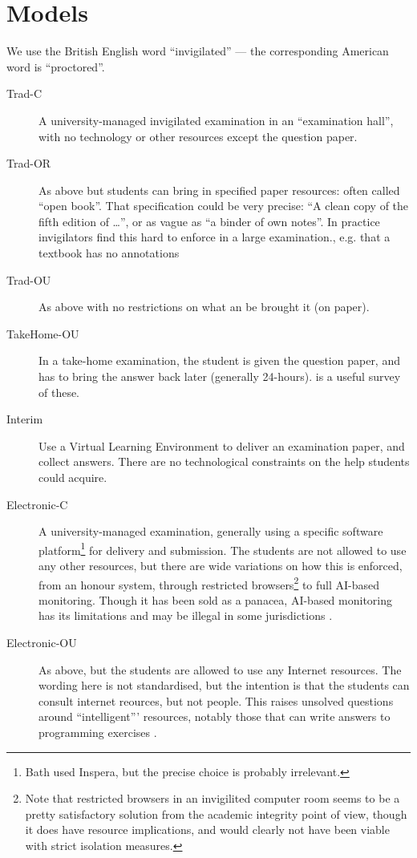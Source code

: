 \documentclass{article}
\begin{document}
\section{Models}
We use the British English word ``invigilated'' --- the corresponding American word is ``proctored''.
\begin{description}
\item[Trad-C]A university-managed invigilated examination in an ``examination hall'', with no technology or other resources except the question paper.
\item[Trad-OR]As above but students can bring in specified paper resources: often called ``open book''. That specification could be very precise: ``A clean copy of the fifth edition of \dots'', or as vague as ``a binder of own notes''.  In practice invigilators find this hard to enforce in a large examination., e.g. that a textbook has no annotations
\item[Trad-OU]As above with no restrictions on what an be brought it (on paper).
\item[TakeHome-OU]In a take-home examination, the student is given the question paper, and has to bring the answer back later (generally 24-hours). \citet{bengtsson2019a} is a useful survey of these.
\item[Interim]Use a Virtual Learning Environment to deliver an examination paper, and collect answers. There are no technological constraints on the help students could acquire.
\item[Electronic-C]A university-managed examination, generally using a specific software platform\footnote{Bath used Inspera, but the precise choice is probably irrelevant.} for delivery and submission. The students are not allowed to use any other resources, but there are wide variations on how this is enforced, from an honour system, through restricted browsers\footnote{Note that restricted browsers in an invigilited computer room seems to be a pretty satisfactory solution from the academic integrity point of view, though it does have resource implications, and would clearly not have been viable with strict isolation measures.} to full AI-based monitoring. Though it has been sold as a panacea, AI-based monitoring has its limitations \citep{NewYorkTimes2022l} and may be illegal in some jurisdictions \citep{JISC2022a}.
\item[Electronic-OU]As above, but the students are allowed to use any Internet resources. The wording here is not standardised, but the intention is that the students can consult internet reources, but not people. This raises unsolved questions around ``intelligent''' resources, notably those that can write answers to programming exercises \citep{FinnieAnsleyetal2022a}.
\end{description}
\end{document}
